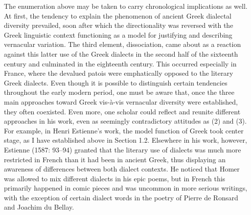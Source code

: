 \begin{styleStandard}
The enumeration above may be taken to carry chronological implications as well. At first, the tendency to explain the phenomenon of ancient Greek dialectal diversity prevailed, soon after which the directionality was reversed with the Greek linguistic context functioning as a model for justifying and describing vernacular variation. The third element, dissociation, came about as a reaction against this latter use of the Greek dialects in the second half of the sixteenth century and culminated in the eighteenth century. This occurred especially in France, where the devalued patois were emphatically opposed to the literary Greek dialects. Even though it is possible to distinguish certain tendencies throughout the early modern period, one must be aware that, once the three main approaches toward Greek vis-à-vis vernacular diversity were established, they often coexisted. Even more, one scholar could reflect and reunite different approaches in his work, even as seemingly contradictory attitudes as (2) and (3). For example, in Henri Estienne’s work, the model function of Greek took center stage, as I have established above in Section 1.2. Elsewhere in his work, however, Estienne (1587: 93–94) granted that the literary use of dialects was much more restricted in French than it had been in ancient Greek, thus displaying an awareness of differences between both dialect contexts. He noticed that Homer was allowed to mix different dialects in his epic poems, but in French this primarily happened in comic pieces and was uncommon in more serious writings, with the exception of certain dialect words in the poetry of Pierre de Ronsard and Joachim du Bellay.
\end{styleStandard}

